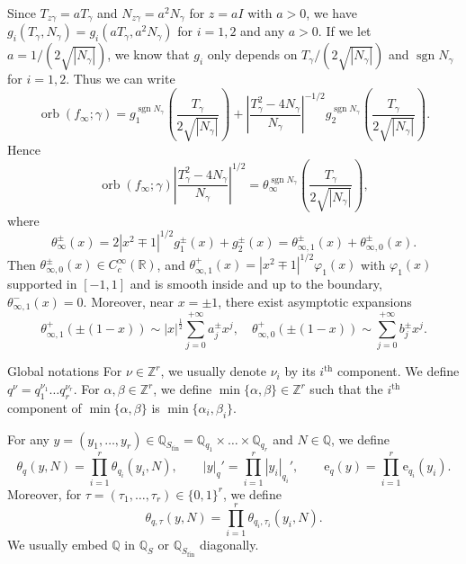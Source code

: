 \documentclass[10pt,oneside,reqno]{amsart}
\makeatletter
\newcommand\rme{\mathrm{e}}
\newcommand\QQ{\mathbb{Q}}
\newcommand\RR{\mathbb{R}}
\newcommand\ZZ{\mathbb{Z}}
\DeclareMathOperator\sgn{sgn}
\newcommand\fin{\mathrm{fin}}
\DeclareMathOperator\orb{orb}
\newcommand\legendresymbol[2]{\genfrac{(}{)}{}{}{#1}{#2}}
\def\subsection{\@startsection{subsection}{2}
  \z@{3pt\@plus0pt}{-.5em}%
  {\normalfont\bfseries}}
\theoremstyle{THEOREM}
\theoremstyle{DEFINITION}
\theoremstyle{EXERCISE}
\numberwithin{equation}{section}
\makeatother
\begin{document}
Since $T_{z\gamma}=aT_\gamma$ and  $N_{z\gamma}=a^2N_\gamma$ for $z=aI$ with $a>0$, we have $g_i(T_\gamma,N_\gamma)=g_i(aT_\gamma,a^2N_\gamma)$
for $i=1,2$ and any $a>0$. If we let $a=1/(2\sqrt{|N_\gamma|})$, we know that $g_i$ only depends on $T_\gamma/(2\sqrt{|N_\gamma|})$ and $\sgn N_\gamma$ for $i=1,2$. Thus we can write
\[
\orb(f_\infty;\gamma)=g_1^{\sgn N_\gamma}\legendresymbol{T_\gamma}{2\sqrt{|N_\gamma|}}+\left|\frac{T_\gamma^2-4N_\gamma}{N_\gamma}\right|^{-1/2}g_2^{\sgn N_\gamma}\legendresymbol{T_\gamma}{2\sqrt{|N_\gamma|}}.
\]
Hence
\begin{equation}\label{eq:orbittheta}
\orb(f_\infty;\gamma)\left|\frac{T_\gamma^2-4N_\gamma}{N_\gamma}\right|^{1/2} 
      = \theta_\infty^{\sgn N_\gamma}\legendresymbol{T_\gamma}{2\sqrt{|N_\gamma|}},
\end{equation}
where
\begin{equation}\label{eq:deftheta}
\theta_\infty^\pm(x)=2|x^2\mp 1|^{1/2}g_1^\pm(x)+g_2^\pm(x)=\theta_{\infty,1}^\pm(x)+\theta_{\infty,0}^\pm(x).
\end{equation}
Then $\theta_{\infty,0}^\pm(x)\in C_c^\infty(\RR)$, and $\theta_{\infty,1}^+(x)=|x^2\mp 1|^{1/2}\varphi_1(x)$ with $\varphi_1(x)$ supported in $[-1,1]$ and is smooth inside and up to the boundary, $\theta_{\infty,1}^-(x)=0$. Moreover, near $x=\pm 1$, there exist asymptotic expansions \cite[Lemme 3.3]{langlands2013}
\begin{equation}\label{eq:thetaasymp}
\theta^+_{\infty,1}(\pm(1-x))\sim|x|^{\frac12}\sum_{j=0}^{+\infty}a_j^{\pm}x^j,\quad \theta^+_{\infty,0}(\pm(1-x))\sim\sum_{j=0}^{+\infty}b_j^{\pm}x^j.
\end{equation}

\subsection{Global notations} For $\nu\in \ZZ^r$, we usually denote $\nu_i$ by its $i^{\mathrm{th}}$ component. We define $q^\nu=q_1^{\nu_1}\dots q_r^{\nu_r}$.
For $\alpha,\beta\in \ZZ^r$, we define $\min\{\alpha,\beta\}\in \ZZ^r$ such that the $i^{\mathrm{th}}$ component of $\min\{\alpha,\beta\}$ is $\min\{\alpha_i,\beta_i\}$.

For any $y=(y_1,\dots,y_r)\in \QQ_{S_\fin}=\QQ_{q_1}\times\dots\times\QQ_{q_r}$ and $N\in \QQ$, we define
\[
\theta_{q}(y,N)=\prod_{i=1}^{r}\theta_{q_i}(y_i,N),\qquad|y|_q'=\prod_{i=1}^{r}|y_i|_{q_i}',\qquad \rme_q(y)=\prod_{i=1}^{r}\rme_{q_i}(y_i).
\]
Moreover, for $\tau=(\tau_1,\dots,\tau_r)\in \{0,1\}^r$, we define
\[
\theta_{q,\tau}(y,N)=\prod_{i=1}^{r}\theta_{q_i,\tau_i}(y_i,N).
\]
We usually embed $\QQ$ in $\QQ_S$ or $\QQ_{S_\fin}$ diagonally. 
\end{document}

